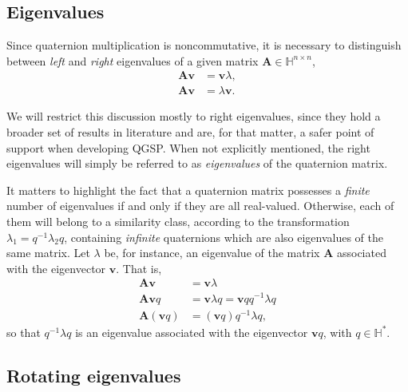\subsection{Eigenvalues}
Since quaternion multiplication is noncommutative, it is necessary to distinguish between \textit{left} and \textit{right} eigenvalues of a given matrix $ \mathbf{A} \in \mathbb{H}^{n \times n} $,
\begin{align*}
\mathbf{A} \mathbf{v} &= \mathbf{v} \lambda, \tag{right} \\
\mathbf{A} \mathbf{v} &= \lambda \mathbf{v}.  \tag{left}
\end{align*}

We will restrict this discussion mostly to right eigenvalues, since they hold a broader set of results in literature \cite[Cap. 5]{zhang1997quaternions} and are, for that matter, a safer point of support when developing QGSP. When not explicitly mentioned, the right eigenvalues will simply be referred to as \textit{eigenvalues} of the quaternion matrix.

It matters to highlight the fact that a quaternion matrix possesses a \textit{finite} number of eigenvalues if and only if they are all real-valued. Otherwise, each of them will belong to a similarity class, according to the transformation $ \lambda_1 = q^{-1} \lambda_2 q $, containing \textit{infinite} quaternions which are also eigenvalues of the same matrix. Let $ \lambda $ be, for instance, an eigenvalue of the matrix $ \mathbf{A} $ associated with the eigenvector $ \mathbf{v} $. That is,
\begin{equation}
\begin{aligned}
\label{eq:similar}
\mathbf{A} \mathbf{v} &= \mathbf{v} \lambda \\
\mathbf{A} \mathbf{v} q &= \mathbf{v} \lambda q = \mathbf{v} q q^{-1} \lambda q \\
\mathbf{A} (\mathbf{v} q) &= (\mathbf{v} q) q^{-1} \lambda q,
\end{aligned}
\end{equation}
so that $ q^{-1} \lambda q $ is an eigenvalue associated with the eigenvector $ \mathbf{v}q $, with $ q \in \mathbb{H}^\ast $.

\subsection{Rotating eigenvalues}
\label{subsec:rotacionando}

